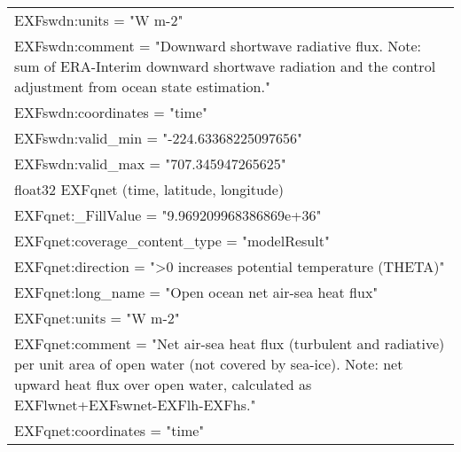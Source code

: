 \begin{longtable}{|p{\textwidth}|}
\hspace{0.5cm}\hspace{0.5cm}EXFswdn:units = "W m-2"\\
\hspace{0.5cm}\hspace{0.5cm}EXFswdn:comment = "Downward shortwave radiative flux. Note: sum of ERA-Interim downward shortwave radiation and the control adjustment from ocean state estimation."\\
\hspace{0.5cm}\hspace{0.5cm}EXFswdn:coordinates = "time"\\
\hspace{0.5cm}\hspace{0.5cm}EXFswdn:valid\_min = "-224.63368225097656"\\
\hspace{0.5cm}\hspace{0.5cm}EXFswdn:valid\_max = "707.345947265625"\\
\hspace{0.5cm}float32 EXFqnet (time, latitude, longitude)\\
\hspace{0.5cm}\hspace{0.5cm}EXFqnet:\_FillValue = "9.969209968386869e+36"\\
\hspace{0.5cm}\hspace{0.5cm}EXFqnet:coverage\_content\_type = "modelResult"\\
\hspace{0.5cm}\hspace{0.5cm}EXFqnet:direction = ">0 increases potential temperature (THETA)"\\
\hspace{0.5cm}\hspace{0.5cm}EXFqnet:long\_name = "Open ocean net air-sea heat flux"\\
\hspace{0.5cm}\hspace{0.5cm}EXFqnet:units = "W m-2"\\
\hspace{0.5cm}\hspace{0.5cm}EXFqnet:comment = "Net air-sea heat flux (turbulent and radiative) per unit area of open water (not covered by sea-ice). Note: net upward heat flux over open water, calculated as EXFlwnet+EXFswnet-EXFlh-EXFhs."\\
\hspace{0.5cm}\hspace{0.5cm}EXFqnet:coordinates = "time"\\

\end{longtable}
